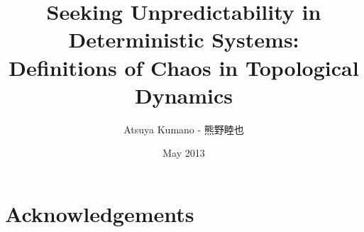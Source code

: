 \documentclass[12pt,twoside]{reedthesis}
\begin{document}
\title{Seeking Unpredictability in Deterministic Systems:\\Definitions of Chaos in Topological Dynamics}
\author{Atsuya Kumano - 熊野睦也}
\date{May 2013}

\chapter*{Acknowledgements}


\end{document}
